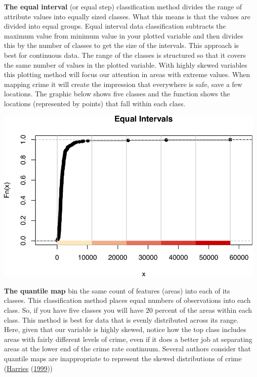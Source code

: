 \documentclass[
]{book}
\begin{document}
\textbf{The equal interval} (or equal step) classification method divides the range of attribute values into equally sized classes. What this means is that the values are divided into equal groups. Equal interval data classification subtracts the maximum value from minimum value in your plotted variable and then divides this by the number of classes to get the size of the intervals. This approach is best for continuous data. The range of the classes is structured so that it covers the same number of values in the plotted variable. With highly skewed variables this plotting method will focus our attention in areas with extreme values. When mapping crime it will create the impression that everywhere is safe, save a few locations. The graphic below shows five classes and the function shows the locations (represented by points) that fall within each class.

\includegraphics{crime_mapping_files/figure-latex/unnamed-chunk-90-1.pdf}

\textbf{The quantile map} bin the same count of features (areas) into each of its classes. This classification method places equal numbers of observations into each class. So, if you have five classes you will have 20 percent of the areas within each class. This method is best for data that is evenly distributed across its range. Here, given that our variable is highly skewed, notice how the top class includes areas with fairly different levels of crime, even if it does a better job at separating areas at the lower end of the crime rate continuum. Several authors consider that quantile maps are inappropriate to represent the skewed distributions of crime (\protect\hyperlink{ref-Harries_1999}{Harries} (\protect\hyperlink{ref-Harries_1999}{1999}))
\end{document}
